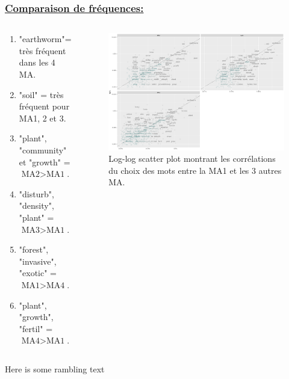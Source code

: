 \documentclass[xcolor=dvipsnames]{beamer}
\begin{document}
	\begin{frame}
		\frametitle{\underline{Comparaison de fréquences:}}
		\begin{columns}
			\begin{column}{0.4\textwidth} %
				\begin{enumerate}
					\item "earthworm"= très fréquent dans les 4 MA.
					\item "soil" = très fréquent pour MA1, 2 et 3.
					\item "plant", "community" et "growth" = $\text{MA2} > \text{MA1}$.
					\item "disturb", "density", "plant" = $\text{MA3} > \text{MA1}$.
					\item "forest", "invasive", "exotic" = $\text{MA1} > \text{MA4}$.
					\item "plant", "growth", "fertil" = $\text{MA4} > \text{MA1}$.
				\end{enumerate}
			\end{column}
			\begin{column}{0.6\textwidth}
				\begin{figure}[htb] %
					\begin{center} %
						\includegraphics[width=1\textwidth]{scales_graph.png}
						\caption{Log-log scatter plot montrant les corrélations du choix des mots entre la MA1 et les 3 autres MA.}\label{log_log_sp}
					\end{center}
				\end{figure}
			\end{column}
		\end{columns}
		\vspace{\baselineskip}
		Here is some rambling text
	\end{frame}
\end{document}
